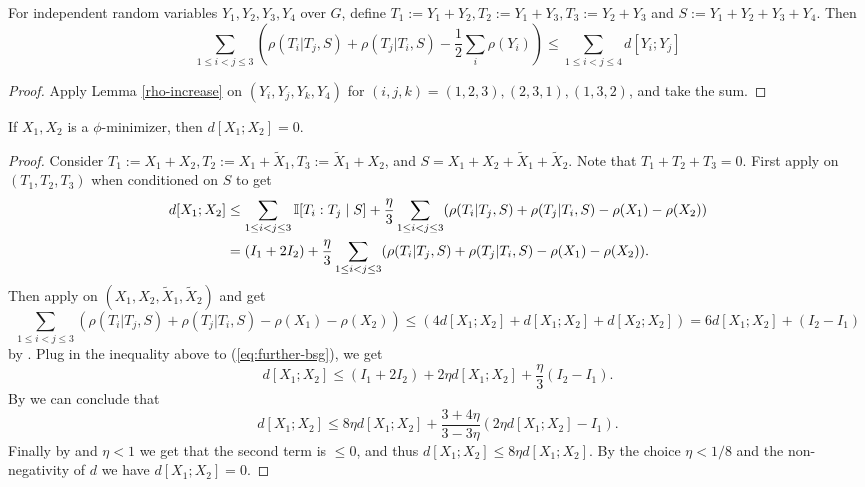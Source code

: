 \begin{lemma}\label{rho-increase-symmetrized}
  For independent random variables $Y_1,Y_2,Y_3,Y_4$ over $G$, define $T_1:=Y_1+Y_2,T_2:=Y_1+Y_3,T_3:=Y_2+Y_3$ and $S:=Y_1+Y_2+Y_3+Y_4$. Then
  $$\sum_{1 \leq i<j \leq 3} (\rho(T_i|T_j,S) + \rho(T_j|T_i,S) -  \frac{1}{2}\sum_{i} \rho(Y_i))\le \sum_{1\leq i < j \leq 4}d[Y_i;Y_j]$$
\end{lemma}
\begin{proof}
  Apply Lemma \ref{rho-increase} on $(Y_i,Y_j,Y_k,Y_4)$ for $(i,j,k)=(1,2,3),(2,3,1),(1,3,2)$, and take the sum.
\end{proof}

\begin{proposition}\label{phi-minimizer-zero-distance}  If $X_1,X_2$ is a $\phi$-minimizer, then $d[X_1;X_2] = 0$.
\end{proposition}

\begin{proof}
Consider $T_1:=X_1+X_2,T_2:=X_1+\tilde X_1, T_3:=\tilde X_1 + X_2$, and $S=X_1+X_2+\tilde X_1 + \tilde X_2$. Note that $T_1+T_2+T_3=0$.
First apply  on $(T_1,T_2,T_3)$ when conditioned on $S$ to get
\begin{align}  \label{eq:further-bsg}
d[X_1;X_2] &\leq  \sum_{1 \leq i<j \leq 3} \mathbb{I}[T_i:T_j\mid S] + \frac{\eta}{3}   \sum_{1 \leq i<j \leq 3} (\rho(T_i|T_j,S) + \rho(T_j|T_i,S) -\rho(X_1)-\rho(X_2))\nonumber\\
&= (I_1+2I_2) + \frac{\eta}{3}   \sum_{1 \leq i<j \leq 3} (\rho(T_i|T_j,S) + \rho(T_j|T_i,S) -\rho(X_1)-\rho(X_2)).
\end{align}
Then apply  on $(X_1,X_2,\tilde X_1,\tilde X_2)$ and get
$$\sum_{1 \leq i<j \leq 3} (\rho(T_i|T_j,S) + \rho(T_j|T_i,S) -  \rho(X_1)-\rho(X_2))\le (4d[X_1;X_2]+d[X_1;X_2]+d[X_2;X_2])= 6 d[X_1;X_2]+(I_2-I_1)$$
by . Plug in the inequality above to (\ref{eq:further-bsg}), we get
$$d[X_1;X_2] \le (I_1+2I_2)+2\eta d[X_1;X_2]+\frac{\eta}{3}(I_2-I_1).$$
By  we can conclude that
$$d[X_1;X_2] \le 8\eta d[X_1;X_2]+\frac{3+4\eta}{3-3\eta} (2\eta d[X_1;X_2]-I_1).$$
Finally by  and $\eta<1$ we get that the second term is $\le 0$, and thus $d[X_1;X_2] \le 8\eta d[X_1;X_2]$. By the choice $\eta<1/8$ and the non-negativity of $d$ we have $d[X_1;X_2]=0$.
\end{proof}


